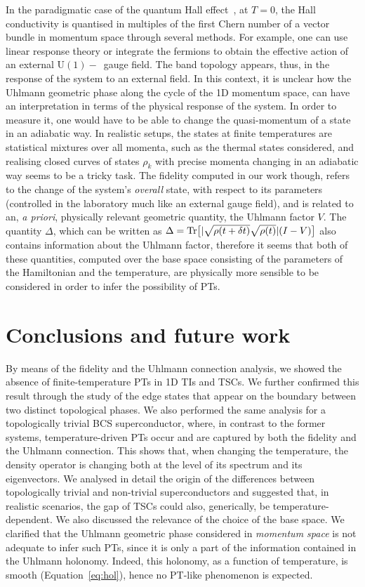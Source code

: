 In the paradigmatic case of the quantum Hall effect~\cite{and:mat:uem:75}, at $T=0$, the Hall conductivity is quantised in multiples of the first Chern number of a vector bundle in momentum space through several methods. For example, one can use linear response theory or integrate the fermions to obtain the effective action of an external $\text{U}(1)-$~gauge field. The band topology appears, thus, in the response of the system to an external field. In this context, it is unclear how the Uhlmann geometric phase along the cycle of the 1D momentum space, can have an interpretation in terms of the physical response of the system. In order to measure it, one would have to be able to change the quasi-momentum of a state in an adiabatic way. In realistic setups, the states at finite temperatures are statistical mixtures over all momenta, such as the thermal states considered, and realising closed curves of states $\rho_k$ with precise momenta changing in an adiabatic way seems to be a tricky task. The fidelity computed in our work though, refers to the change of the system's {\em overall} state, with respect to its parameters (controlled in the laboratory much like an external gauge field), and is related to an, \textit{a priori}, physically relevant geometric quantity, the Uhlmann factor $V$. The quantity $\Delta$, which can  be written as $\Delta=\text{Tr} \big[|\sqrt{\rho(t+\delta t)}\sqrt{\rho(t)}|(I-V)\big]$ also contains information about the Uhlmann factor, therefore it seems that both of these quantities, computed over the base space consisting of the parameters of the Hamiltonian and the temperature, are physically more sensible to be considered in order to infer the possibility of PTs.


\section*{Conclusions and future work}
\label{Conclusions and Outlook}

By means of the fidelity and the Uhlmann connection analysis, we showed the absence of finite-temperature PTs in 1D TIs and TSCs. We further confirmed this result through the study of the edge states that appear on the boundary between two distinct topological phases. We also performed the same analysis for a topologically trivial BCS superconductor, where, in contrast to the former systems, temperature-driven PTs occur and are captured by both the fidelity and the Uhlmann connection. This shows that, when changing the temperature, the density operator is changing both at the level of its spectrum and its eigenvectors. We analysed in detail the origin of the differences between topologically trivial and non-trivial superconductors and suggested that, in realistic scenarios, the gap of TSCs could also, generically, be temperature-dependent. We also discussed the relevance of the choice of the base space. We clarified that the Uhlmann geometric phase considered in \textit{momentum space} is not adequate to infer such PTs, since it is only a part of the information contained in the Uhlmann holonomy. Indeed, this holonomy, as a function of temperature, is smooth (Equation~\eqref{eq:hol}), hence no PT-like phenomenon is expected.

